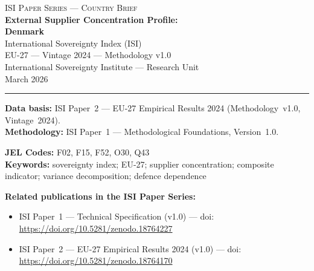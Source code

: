\documentclass[12pt,a4paper]{article}
\begin{document}
\hypersetup{pageanchor=false}

\begin{titlepage}
\centering
\vspace*{2cm}
{\Large\textsc{ISI Paper Series --- Country Brief}}\\[1.2cm]
{\LARGE\bfseries External Supplier Concentration Profile:\\[0.3em]
Denmark}\\[1.5cm]
{\large International Sovereignty Index (ISI)\\[0.3em]
EU-27 --- Vintage 2024 --- Methodology v1.0}\\[1.2cm]
{\large International Sovereignty Institute --- Research Unit}\\[0.8cm]
{\large March 2026}

\vspace{0.8cm}
\noindent\rule{\textwidth}{0.4pt}
\vspace{0.4cm}

\begin{flushleft}
\noindent\textbf{Data basis:} ISI Paper~2 --- EU-27 Empirical Results 2024 (Methodology~v1.0, Vintage~2024).\\[4pt]
\noindent\textbf{Methodology:} ISI Paper~1 --- Methodological Foundations, Version~1.0.

\medskip

\noindent\textbf{JEL Codes:} F02, F15, F52, O30, Q43\\[4pt]
\noindent\textbf{Keywords:} sovereignty index; EU-27; supplier concentration; composite indicator; variance decomposition; defence dependence

\medskip

\noindent\textbf{Related publications in the ISI Paper Series:}
\begin{itemize}[nosep,leftmargin=1.5em]
\item ISI Paper~1 --- Technical Specification (v1.0) --- doi:\\
  \url{https://doi.org/10.5281/zenodo.18764227}
\item ISI Paper~2 --- EU-27 Empirical Results 2024 (v1.0) --- doi:\\
  \url{https://doi.org/10.5281/zenodo.18764170}
\end{itemize}
\end{flushleft}
\vfill
\end{titlepage}
\end{document}
